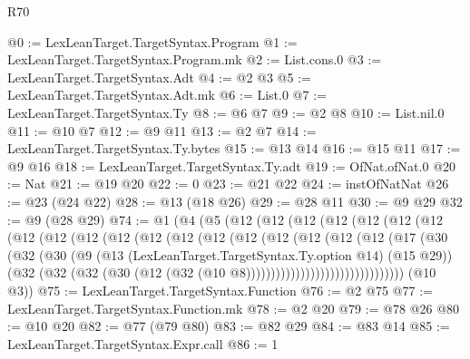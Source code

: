 \begin{lexlean}{R70}
\begin{coremodule}
@0 := LexLeanTarget.TargetSyntax.Program
@1 := LexLeanTarget.TargetSyntax.Program.mk
@2 := List.cons.{0}
@3 := LexLeanTarget.TargetSyntax.Adt
@4 := @2 @3
@5 := LexLeanTarget.TargetSyntax.Adt.mk
@6 := List.{0}
@7 := LexLeanTarget.TargetSyntax.Ty
@8 := @6 @7
@9 := @2 @8
@10 := List.nil.{0}
@11 := @10 @7
@12 := @9 @11
@13 := @2 @7
@14 := LexLeanTarget.TargetSyntax.Ty.bytes
@15 := @13 @14
@16 := @15 @11
@17 := @9 @16
@18 := LexLeanTarget.TargetSyntax.Ty.adt
@19 := OfNat.ofNat.{0}
@20 := Nat
@21 := @19 @20
@22 := 0
@23 := @21 @22
@24 := instOfNatNat
@26 := @23 (@24 @22)
@28 := @13 (@18 @26)
@29 := @28 @11
@30 := @9 @29
@32 := @9 (@28 @29)
@74 := @1
    (@4
      (@5
        (@12
          (@12
            (@12
              (@12
                (@12
                  (@12
                    (@12
                      (@12
                        (@12
                          (@12
                            (@12
                              (@12
                                (@12
                                  (@12
                                    (@12
                                      (@12
                                        (@12
                                          (@12
                                            (@12
                                              (@17
                                                (@30
                                                  (@32
                                                    (@30
                                                      (@9
                                                        (@13
                                                          (LexLeanTarget.TargetSyntax.Ty.option @14)
                                                          (@15 @29))
                                                        (@32
                                                          (@32
                                                            (@32
                                                              (@30
                                                                (@12
                                                                  (@32
                                                                    (@10
                                                                      @8))))))))))))))))))))))))))))))))
      (@10 @3))
@75 := LexLeanTarget.TargetSyntax.Function
@76 := @2 @75
@77 := LexLeanTarget.TargetSyntax.Function.mk
@78 := @2 @20
@79 := @78 @26
@80 := @10 @20
@82 := @77 (@79 @80)
@83 := @82 @29
@84 := @83 @14
@85 := LexLeanTarget.TargetSyntax.Expr.call
@86 := 1

\end{coremodule}
\end{lexlean}

